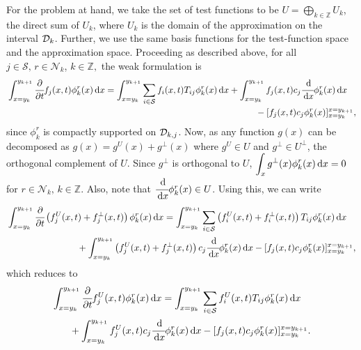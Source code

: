 For the problem at hand, we take the set of test functions to be \(U = \bigoplus\limits_{k\in\mathbb Z} U_k\), the direct sum of \(U_k\), where \(U_k\) is the domain of the approximation on the interval \(\mathcal{D}_k\). Further, we use the same basis functions for the test-function space and the approximation space. Proceeding as described above, for all \(j\in\mathcal S,\,r\in\mathcal N_k\), \(k\in\mathbb Z,\) the weak formulation is 
\begin{align*}
	\begin{multlined}[t]\int_{x=y_k}^{y_{k+1}}\cfrac{\partial}{\partial t} f_j(x,t)\phi^r_k(x)\wrt x = \int_{x=y_k}^{y_{k+1}}\sum_{i\in\calS}  f_i(x,t)T_{ij}\phi^r_k(x)\wrt x  
	+  \int_{x=y_k}^{y_{k+1}} f_j(x,t)c_j\cfrac{\wrt}{\wrt x}\phi^r_k(x)\wrt x \\ {}- [f_j(x,t)c_j\phi^r_k(x)]_{x=y_k}^{x=y_{k+1}}, \end{multlined}
\end{align*}
since \(\phi^r_k\) is compactly supported on \(\mathcal{D}_{k,j}\). Now, as any function \(g(x)\) can be decomposed as \(g(x) = g^{U}(x)+g^\perp(x)\) where \(g^{U}\in U\) and \(g^\perp \in U^\perp\), the orthogonal complement of \(U\). Since \(g^\perp\) is orthogonal to \(U\), \(\displaystyle\int_{x}g^\perp(x)\phi^r_k(x)\, \mathrm{d} x=0\) for \(r\in\mathcal N_k,\,k\in\mathbb Z\). Also, note that \(\cfrac{\, \mathrm{d}}{\, \mathrm{d} x}\phi^r_k(x)\in U\). Using this, we can write 
\begin{align*}
	\begin{multlined}[t]\int_{x=y_{k}}^{y_{k+1}}\cfrac{\partial}{\partial t} \left(f_j^U(x,t)+f_j^\perp(x,t)\right)\phi^r_k(x)\wrt x 
	= \int_{x=y_k}^{y_{k+1}}\sum_{i\in\calS} \left(f_i^U(x,t)+f_i^\perp(x,t)\right)T_{ij}\phi^r_k(x)\wrt x  
	\\ {}
	+  \int_{x=y_k}^{y_{k+1}} \left(f_j^U(x,t)+f_j^\perp(x,t)\right)c_j\cfrac{\wrt}{\wrt x}\phi^r_k(x)\wrt x - [f_j(x,t)c_j\phi^r_k(x)]_{x=y_k}^{x=y_{k+1}}, \end{multlined}
\end{align*}
	which reduces to
\begin{align}
	\begin{multlined}[t]\int_{x=y_k}^{y_{k+1}}\cfrac{\partial}{\partial t} f_j^U(x,t)\phi^r_k(x)\wrt x = \int_{x=y_k}^{y_{k+1}}\sum_{i\in\calS} f_i^U(x,t)T_{ij}\phi^r_k(x)\wrt x  
	\\{} + \int_{x=y_k}^{y_{k+1}} f_j^U(x,t)c_j\cfrac{\wrt}{\wrt x}\phi^r_k(x)\wrt x - [f_j(x,t)c_j\phi^r_k(x)]_{x=y_k}^{x=y_{k+1}}. \end{multlined} \label{eqn:hash}
\end{align}
